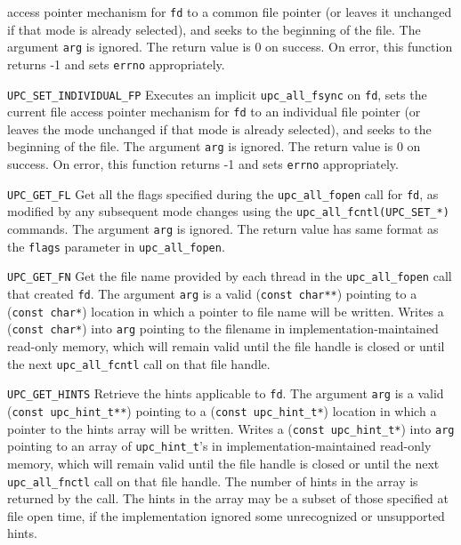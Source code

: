 \documentclass[12pt,titlepage]{article}
\begin{document}
\begin{description}
access pointer mechanism for {\tt fd} to a common file pointer (or leaves it
unchanged if that mode is already selected), and seeks 
to the beginning of the file.
The argument {\tt arg} is ignored.
The return value is 0 on success. On error, this function returns 
-1 and sets {\tt errno} appropriately.
\item{\tt UPC\_SET\_INDIVIDUAL\_FP} 
Executes an implicit {\tt upc\_all\_fsync} on {\tt fd}, sets the current 
file access pointer mechanism for {\tt fd} to an individual file pointer (or
leaves the mode unchanged if that mode is already selected), and seeks to the
beginning of the file.
The argument {\tt arg} is ignored.
The return value is 0 on success. On error, this function returns 
-1 and sets {\tt errno} appropriately.
\item{\tt UPC\_GET\_FL}
Get all the flags specified during the {\tt upc\_all\_fopen} call for {\tt fd},
as modified by any subsequent mode changes using the {\tt upc\_all\_fcntl(UPC\_SET\_*)} commands. 
The argument {\tt arg} is ignored.
The return value has same format as the {\tt flags} parameter in {\tt upc\_all\_fopen}.
\item{\tt UPC\_GET\_FN}
Get the file name provided by each thread in the {\tt upc\_all\_fopen} 
call that created {\tt fd}.
The argument {\tt arg} is a valid ({\tt const char**}) pointing to a ({\tt const char*}) location 
in which a pointer to file name will be written.
Writes a ({\tt const char*}) into {\tt *arg} pointing to the filename in implementation-maintained 
read-only memory, which will remain valid until the file handle 
is closed or until the next {\tt upc\_all\_fcntl} call on that file 
handle.
\item{\tt UPC\_GET\_HINTS}
Retrieve the hints applicable to {\tt fd}.
The argument {\tt arg} is a valid ({\tt const upc\_hint\_t**}) pointing to a ({\tt const upc\_hint\_t*}) 
location in which a pointer to the hints array will be written.
Writes a ({\tt const upc\_hint\_t*}) into {\tt *arg} pointing to an array of {\tt upc\_hint\_t}'s 
in implementation-maintained read-only memory, which will remain 
valid until the file handle is closed or until the next {\tt upc\_all\_fnctl} 
call on that file handle. The number of hints in the array is 
returned by the call.
The hints in the array may be a subset of those specified at 
file open time, if the implementation ignored some unrecognized 
or unsupported hints.

\end{description}
\end{document}
